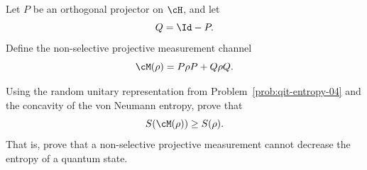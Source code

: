 Let $P$ be an orthogonal projector on $\cH$, and let
$$
Q=\Id-P.
$$
Define the non-selective projective measurement channel
$$
\cM(\rho)=P\rho P+Q\rho Q.
$$

Using the random unitary representation from Problem~\ref{prob:qit-entropy-04} and the concavity of the von Neumann entropy, prove that
$$
S(\cM(\rho))\geq S(\rho).
$$
That is, prove that a non-selective projective measurement cannot decrease the entropy of a quantum state.
